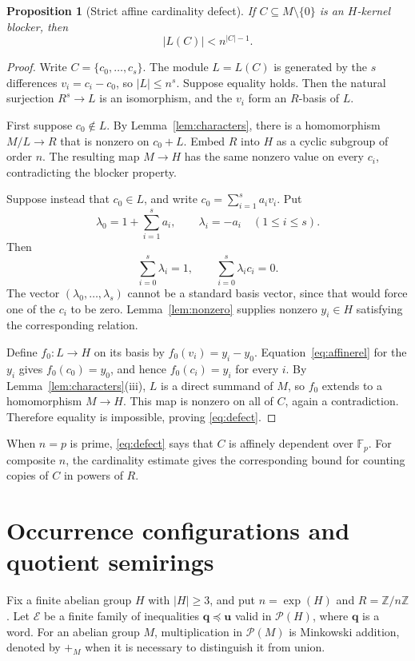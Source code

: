 \documentclass[10pt,a4paper]{amsart}
\newtheorem{proposition}[theorem]{Proposition}
\numberwithin{equation}{section}
\newcommand{\Pow}{\mathcal{P}}
\newcommand{\expon}{\operatorname{exp}}
\newcommand{\Z}{\mathbb{Z}}
\newcommand{\F}{\mathbb{F}}
\newcommand{\bu}{\mathbf{u}}
\newcommand{\bq}{\mathbf{q}}
\newcommand{\calE}{\mathcal{E}}
\renewcommand{\leq}{\leqslant}
\renewcommand{\geq}{\geqslant}
\begin{document}
\begin{proposition}[Strict affine cardinality defect]\label{prop:defect}
If $C\subseteq M\setminus\{0\}$ is an $H$-kernel blocker, then
\begin{equation}\label{eq:defect}
 |L(C)|<n^{|C|-1}.
\end{equation}
\end{proposition}
\begin{proof}
Write $C=\{c_0,\ldots,c_s\}$. The module $L=L(C)$ is generated by the $s$ differences $v_i=c_i-c_0$, so $|L|\leq n^s$. Suppose equality holds. Then the natural surjection $R^s\to L$ is an isomorphism, and the $v_i$ form an $R$-basis of $L$.

First suppose $c_0\notin L$. By Lemma~\ref{lem:characters}, there is a homomorphism $M/L\to R$ that is nonzero on $c_0+L$. Embed $R$ into $H$ as a cyclic subgroup of order $n$. The resulting map $M\to H$ has the same nonzero value on every $c_i$, contradicting the blocker property.

Suppose instead that $c_0\in L$, and write $c_0=\sum_{i=1}^{s}a_i v_i$. Put
\[
 \lambda_0=1+\sum_{i=1}^{s}a_i,\qquad \lambda_i=-a_i\quad(1\leq i\leq s).
\]
Then
\begin{equation}\label{eq:affinerel}
 \sum_{i=0}^{s}\lambda_i=1,\qquad \sum_{i=0}^{s}\lambda_i c_i=0.
\end{equation}
The vector $(\lambda_0,\ldots,\lambda_s)$ cannot be a standard basis vector, since that would force one of the $c_i$ to be zero. Lemma~\ref{lem:nonzero} supplies nonzero $y_i\in H$ satisfying the corresponding relation.

Define $f_0:L\to H$ on its basis by $f_0(v_i)=y_i-y_0$. Equation~\eqref{eq:affinerel} for the $y_i$ gives $f_0(c_0)=y_0$, and hence $f_0(c_i)=y_i$ for every $i$. By Lemma~\ref{lem:characters}(iii), $L$ is a direct summand of $M$, so $f_0$ extends to a homomorphism $M\to H$. This map is nonzero on all of $C$, again a contradiction. Therefore equality is impossible, proving \eqref{eq:defect}.
\end{proof}

When $n=p$ is prime, \eqref{eq:defect} says that $C$ is affinely dependent over $\F_p$. For composite $n$, the cardinality estimate gives the corresponding bound for counting copies of $C$ in powers of $R$.

\section{Occurrence configurations and quotient semirings}\label{sec:quotients}
Fix a finite abelian group $H$ with $|H|\geq 3$, and put $n=\expon(H)$ and $R=\Z/n\Z$. Let $\calE$ be a finite family of inequalities $\bq\preceq\bu$ valid in $\Pow(H)$, where $\bq$ is a word. For an abelian group $M$, multiplication in $\Pow(M)$ is Minkowski addition, denoted by $+_M$ when it is necessary to distinguish it from union.
\end{document}
